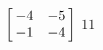 {$\left[\hskip -3pt \begin{array}{cc} -4&-5\\  -1&-4\end {array} \hskip -3pt
 \right] $} 
{$11$}



  

